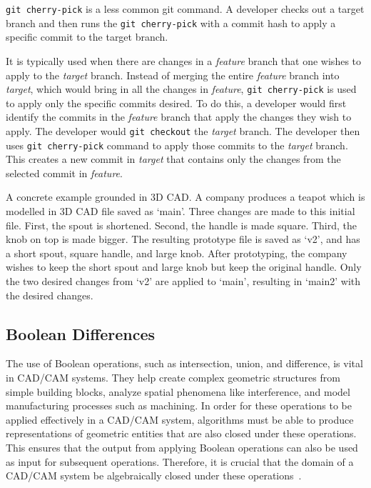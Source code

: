 \documentclass[sigconf,authorversion,nonacm]{acmart}
\begin{document}
\texttt{git cherry-pick} is a less common git command.
A developer checks out a target branch and then runs the \texttt{git cherry-pick} with a commit hash to apply a specific commit to the target branch.

It is typically used when there are changes in a \emph{feature} branch that one wishes to apply to the \emph{target} branch.
Instead of merging the entire \emph{feature} branch into \emph{target}, which would bring in all the changes in \emph{feature}, \texttt{git cherry-pick} is used to apply only the specific commits desired.
To do this, a developer would first identify the commits in the \emph{feature} branch that apply the changes they wish to apply.
The developer would \texttt{git checkout} the \emph{target} branch.
The developer then uses \texttt{git cherry-pick} command to apply those commits to the \emph{target} branch.
This creates a new commit in \emph{target} that contains only the changes from the selected commit in \emph{feature}.

A concrete example grounded in 3D CAD.
A company produces a teapot which is modelled in 3D CAD file saved as `main'.
Three changes are made to this initial file.
First, the spout is shortened.
Second, the handle is made square.
Third, the knob on top is made bigger.
The resulting prototype file is saved as `v2', and has a short spout, square handle, and large knob.
After prototyping, the company wishes to keep the short spout and large knob but keep the original handle.
Only the two desired changes from `v2' are applied to `main', resulting in `main2' with the desired changes.

\subsection{Boolean Differences}

The use of Boolean operations, such as intersection, union, and difference, is vital in CAD/CAM systems. 
They help create complex geometric structures from simple building blocks, analyze spatial phenomena like interference, and model manufacturing processes such as machining. 
In order for these operations to be applied effectively in a CAD/CAM system, algorithms must be able to produce representations of geometric entities that are also closed under these operations. 
This ensures that the output from applying Boolean operations can also be used as input for subsequent operations. 
Therefore, it is crucial that the domain of a CAD/CAM system be algebraically closed under these operations~\cite{tilove1980closure}. 
\end{document}
